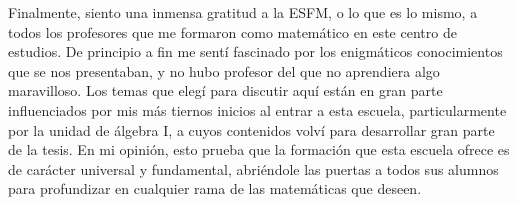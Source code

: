 Finalmente, siento una inmensa gratitud a la ESFM, o lo que es lo mismo, a todos los profesores que me formaron como matemático en este centro de estudios. De principio a fin me sentí fascinado por los enigmáticos conocimientos que se nos presentaban, y no hubo profesor del que no aprendiera algo maravilloso. Los temas que elegí para discutir aquí están en gran parte influenciados por mis más tiernos inicios al entrar a esta escuela, particularmente por la unidad de álgebra I, a cuyos contenidos volví para desarrollar gran parte de la tesis. En mi opinión, esto prueba que la formación que esta escuela ofrece es de carácter universal y fundamental, abriéndole las puertas a todos sus alumnos para profundizar en cualquier rama de las matemáticas que deseen.
\newpage
\thispagestyle{empty}
\

\newpage
{}
\thispagestyle{plain}
\tableofcontents
\newpage
\thispagestyle{empty}
\













